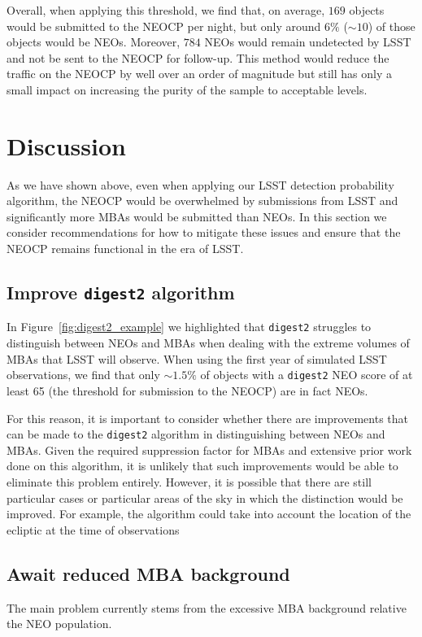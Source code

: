 \documentclass[twocolumn]{aastex631}
\newcommand{\dig}{\texttt{digest2}}
\begin{document}
Overall, when applying this threshold, we find that, on average, $169$ objects would be submitted to the NEOCP per night, but only around $6\%$ (${\sim}10$) of those objects would be NEOs. Moreover, $784$ NEOs would remain undetected by LSST and not be sent to the NEOCP for follow-up. This method would reduce the traffic on the NEOCP by well over an order of magnitude but still has only a small impact on increasing the purity of the sample to acceptable levels.

\section{Discussion} \label{sec:discussion}
As we have shown above, even when applying our LSST detection probability algorithm, the NEOCP would be overwhelmed by submissions from LSST and significantly more MBAs would be submitted than NEOs. In this section we consider recommendations for how to mitigate these issues and ensure that the NEOCP remains functional in the era of LSST.

\subsection{Improve \dig{} algorithm}
In Figure~\ref{fig:digest2_example} we highlighted that \dig{} struggles to distinguish between NEOs and MBAs when dealing with the extreme volumes of MBAs that LSST will observe. When using the first year of simulated LSST observations, we find that only ${\sim}1.5\%$ of objects with a \dig{} NEO score of at least 65 (the threshold for submission to the NEOCP) are in fact NEOs.

For this reason, it is important to consider whether there are improvements that can be made to the \dig{} algorithm in distinguishing between NEOs and MBAs. Given the required suppression factor for MBAs and extensive prior work done on this algorithm, it is unlikely that such improvements would be able to eliminate this problem entirely. However, it is possible that there are still particular cases or particular areas of the sky in which the distinction would be improved. For example, the algorithm could take into account the location of the ecliptic at the time of observations

\subsection{Await reduced MBA background}
The main problem currently stems from the excessive MBA background relative the NEO population. 
\end{document}

